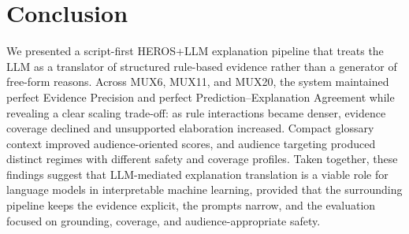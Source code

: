 \documentclass[sigconf,nonacm]{acmart}
\begin{document}
\section{Conclusion}
We presented a script-first HEROS+LLM explanation pipeline that treats the LLM as a translator of structured rule-based evidence rather than a generator of free-form reasons. Across MUX6, MUX11, and MUX20, the system maintained perfect Evidence Precision and perfect Prediction--Explanation Agreement while revealing a clear scaling trade-off: as rule interactions became denser, evidence coverage declined and unsupported elaboration increased. Compact glossary context improved audience-oriented scores, and audience targeting produced distinct regimes with different safety and coverage profiles. Taken together, these findings suggest that LLM-mediated explanation translation is a viable role for language models in interpretable machine learning, provided that the surrounding pipeline keeps the evidence explicit, the prompts narrow, and the evaluation focused on grounding, coverage, and audience-appropriate safety.



\end{document}
